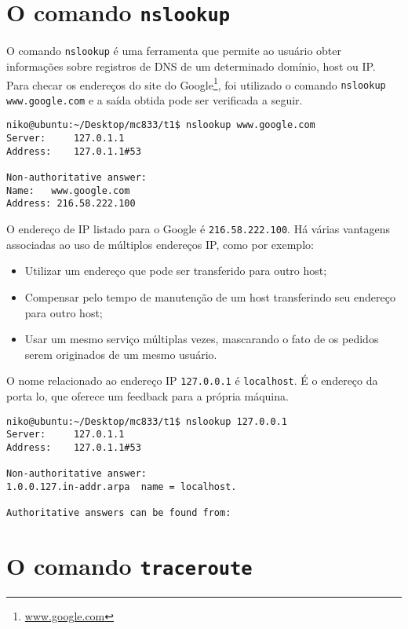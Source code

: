 \documentclass[a4paper,10pt]{article}
\begin{document}
\section{O comando {\tt nslookup}}

O comando {\tt nslookup} é uma ferramenta que permite ao usuário obter informações sobre registros de DNS de um determinado domínio, host ou IP. Para checar os endereços do site do Google\footnote{\url{www.google.com}}, foi utilizado o comando {\tt nslookup www.google.com} e a saída obtida pode ser verificada a seguir.

\begin{lstlisting}
niko@ubuntu:~/Desktop/mc833/t1$ nslookup www.google.com
Server:		127.0.1.1
Address:	127.0.1.1#53

Non-authoritative answer:
Name:	www.google.com
Address: 216.58.222.100

\end{lstlisting}

O endereço de IP listado para o Google é {\tt 216.58.222.100}. Há várias vantagens associadas ao uso de múltiplos endereços IP, como por exemplo:

\begin{itemize}
\item Utilizar um endereço que pode ser transferido para outro host;
\item Compensar pelo tempo de manutenção de um host transferindo seu endereço para outro host;
\item Usar um mesmo serviço múltiplas vezes, mascarando o fato de os pedidos serem originados de um mesmo usuário.
\end{itemize}

O nome relacionado ao endereço IP {\tt 127.0.0.1} é {\tt localhost}. É o endereço da porta lo, que oferece um feedback para a própria máquina.

\begin{lstlisting}
niko@ubuntu:~/Desktop/mc833/t1$ nslookup 127.0.0.1
Server:		127.0.1.1
Address:	127.0.1.1#53

Non-authoritative answer:
1.0.0.127.in-addr.arpa	name = localhost.

Authoritative answers can be found from:

\end{lstlisting}

\section{O comando {\tt traceroute}}
\end{document}
